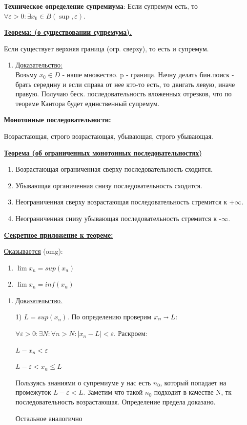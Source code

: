 \documentclass{article}
\newcommand{\deff}[1]{\underline{\textbf{#1}}}
\newcommand{\thmm}[1]{\underline{\textbf{#1}}}
\newcommand{\prooff}[1]{{\underline{Доказательство:}} \\ }
\begin{document}
\textbf{Техническое определение супремиума}: Если супремум есть, то $\forall \varepsilon>0: \exists x_0 \in B(\sup,\varepsilon)$.

\thmm{Теорема: (о существовании супремума).}

Если существует верхняя граница (огр. сверху), то есть и супремум.

\begin{enumerate}
    \item[] \prooff{}
    Возьму $x_0 \in D$ - наше множество. p - граница. Начну делать бин.поиск - брать середину и если справа от нее кто-то есть, то двигать левую, иначе правую. Получаю беск. последовательность вложенных отрезков, что по теореме Кантора будет единственный супремум.
\end{enumerate}

\noindent\deff{Монотонные последовательности:}

\noindent Возрастающая, строго возрастающая, убывающая, строго убывающая.

\noindent \thmm{Теорема (об ограниченных монотонных последовательностях)}

\begin{enumerate}
    \item Возрастающая ограниченная сверху последовательность сходится.
    \item Убывающая органиченная снизу последовательность сходится.
    \item Неограниченная сверху возрастающая последовательность стремится к +$\infty$.
    \item Неограниченная снизу убывающая последовательность стремится к -$\infty$.
\end{enumerate}


    \uline{\textbf{Cекретное приложение к теореме:}}

    \uline{Оказывается} (omg):
    \begin{enumerate}
        \item $\lim x_n = sup (x_n)$
         \item $\lim x_n = inf (x_n)$
    \end{enumerate}
    \begin{enumerate}
        \item[] \uline{Доказательство.}
        
        1) $L = sup(x_n)$. По определению проверим $x_n \shortrightarrow L$:

        $\forall \varepsilon>0: \exists N: \forall n>N: |x_n-L|<\varepsilon$. Раскроем:

        $L-x_n<\varepsilon$

        $L-\varepsilon < x_n \leq L$

        Пользуясь знаниями о супремиуме  у нас есть $n_0$, который попадает на промежуток  $L-\varepsilon < L$. Заметим что такой $n_0$ подходит в качестве N, тк последовательность возрастающая. Определение предела доказано.

        Остальное аналогично

    \end{enumerate}
\end{document}
